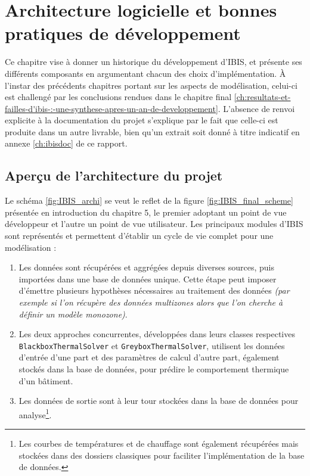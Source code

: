 \chapter{Architecture logicielle et bonnes pratiques de développement}\label{ch:conception-logicielle-refactoring-et-bonnes-pratiques-de-developpement}

Ce chapitre vise à donner un historique du développement d'IBIS, et présente ses différents composants en argumentant chacun des choix d'implémentation.
À l'instar des précédents chapitres portant sur les aspects de modélisation, celui-ci est challengé par les conclusions rendues dans le chapitre final \ref{ch:resultats-et-failles-d'ibis-:-une-synthese-apres-un-an-de-developpement}.
L'absence de renvoi explicite à la documentation du projet s'explique par le fait que celle-ci est produite dans un autre livrable, bien qu'un extrait soit donné à titre indicatif en annexe \ref{ch:ibisdoc} de ce rapport.

\section{Aperçu de l'architecture du projet}\label{sec:apercu-de-l'architecture-du-projet}

    Le schéma \ref{fig:IBIS_archi} se veut le reflet de la figure \ref{fig:IBIS_final_scheme} présentée en introduction du chapitre 5,
    le premier adoptant un point de vue développeur et l'autre un point de vue utilisateur.
    Les principaux modules d'IBIS sont représentés et permettent d'établir un cycle de vie complet pour une modélisation :
    \begin{enumerate}
        \item Les données sont récupérées et aggrégées depuis diverses sources, puis importées dans une base de données unique.
            Cette étape peut imposer d'émettre plusieurs hypothèses nécessaires au traitement des données \textit{(par exemple si l'on récupère des données multizones alors que l'on cherche à définir un modèle monozone)}.
        \item Les deux approches concurrentes, développées dans leurs classes respectives \texttt{BlackboxThermalSolver} et \texttt{GreyboxThermalSolver}, utilisent les données d'entrée d'une part et des paramètres de calcul d'autre part, également stockés dans la base de données, pour prédire le comportement thermique d'un bâtiment.
        \item Les données de sortie sont à leur tour stockées dans la base de données pour analyse\footnote{Les courbes de températures et de chauffage sont également récupérées mais stockées dans des dossiers classiques pour faciliter l'implémentation de la base de données.}.
    \end{enumerate}

